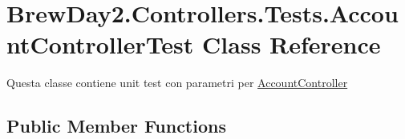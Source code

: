 \hypertarget{class_brew_day2_1_1_controllers_1_1_tests_1_1_account_controller_test}{}\section{Brew\+Day2.\+Controllers.\+Tests.\+Account\+Controller\+Test Class Reference}
\label{class_brew_day2_1_1_controllers_1_1_tests_1_1_account_controller_test}


Questa classe contiene unit test con parametri per \mbox{\hyperlink{class_brew_day2_1_1_controllers_1_1_account_controller}{Account\+Controller}} 


\subsection*{Public Member Functions}
